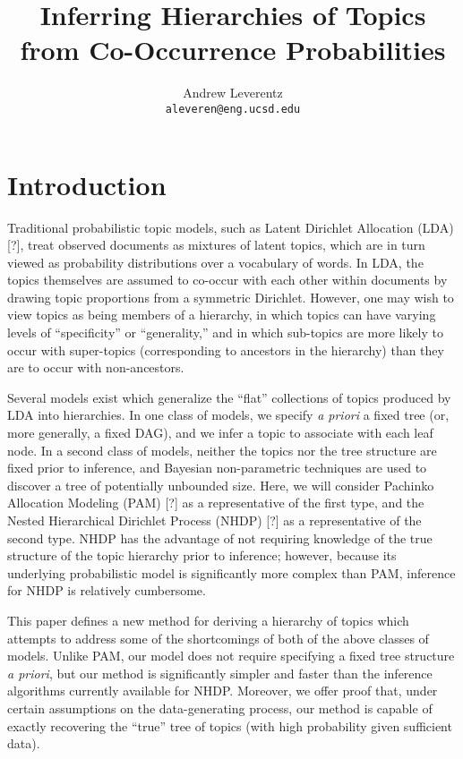 \documentclass{article}
\title{Inferring Hierarchies of Topics from Co-Occurrence Probabilities}
\author{
  Andrew Leverentz \\
  \texttt{aleveren@eng.ucsd.edu} \\
}
\date{}
\theoremstyle{definition}
\newcommand{\TODOcite}{[?]}
\begin{document}
\maketitle


\section{Introduction}

Traditional probabilistic topic models, such as Latent Dirichlet Allocation (LDA) \TODOcite{}, treat observed documents as mixtures of latent topics, which are in turn viewed as probability distributions over a vocabulary of words.
In LDA, the topics themselves are assumed to co-occur with each other within documents by drawing topic proportions from a symmetric Dirichlet.
However, one may wish to view topics as being members of a hierarchy, in which topics can have varying levels of ``specificity'' or ``generality,'' and in which sub-topics are more likely to occur with super-topics (corresponding to ancestors in the hierarchy) than they are to occur with non-ancestors.

Several models exist which generalize the ``flat'' collections of topics produced by LDA into hierarchies.
In one class of models, we specify \emph{a priori} a fixed tree (or, more generally, a fixed DAG), and we infer a topic to associate with each leaf node.
In a second class of models, neither the topics nor the tree structure are fixed prior to inference, and Bayesian non-parametric techniques are used to discover a tree of potentially unbounded size.
Here, we will consider Pachinko Allocation Modeling (PAM) \TODOcite{} as a representative of the first type, and the Nested Hierarchical Dirichlet Process (NHDP) \TODOcite{} as a representative of the second type.
NHDP has the advantage of not requiring knowledge of the true structure of the topic hierarchy prior to inference;
however, because its underlying probabilistic model is significantly more complex than PAM, inference for NHDP is relatively cumbersome.

This paper defines a new method for deriving a hierarchy of topics which attempts to address some of the shortcomings of both of the above classes of models.
Unlike PAM, our model does not require specifying a fixed tree structure \emph{a priori}, but our method is significantly simpler and faster than the inference algorithms currently available for NHDP.
Moreover, we offer proof that, under certain assumptions on the data-generating process, our method is capable of exactly recovering the ``true'' tree of topics (with high probability given sufficient data).
\end{document}
